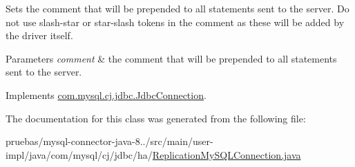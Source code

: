 Sets the comment that will be prepended to all statements sent to the server. Do not use slash-\/star or star-\/slash tokens in the comment as these will be added by the driver itself.


\begin{DoxyParams}{Parameters}
{\em comment} & the comment that will be prepended to all statements sent to the server. \\
\hline
\end{DoxyParams}


Implements \mbox{\hyperlink{interfacecom_1_1mysql_1_1cj_1_1jdbc_1_1_jdbc_connection_adfbd59fbebd013673ed3eb97beb76179}{com.\+mysql.\+cj.\+jdbc.\+Jdbc\+Connection}}.



The documentation for this class was generated from the following file\+:\begin{DoxyCompactItemize}
\item 
pruebas/mysql-\/connector-\/java-\/8../src/main/user-\/impl/java/com/mysql/cj/jdbc/ha/\mbox{\hyperlink{_replication_my_s_q_l_connection_8java}{Replication\+My\+S\+Q\+L\+Connection.\+java}}\end{DoxyCompactItemize}
